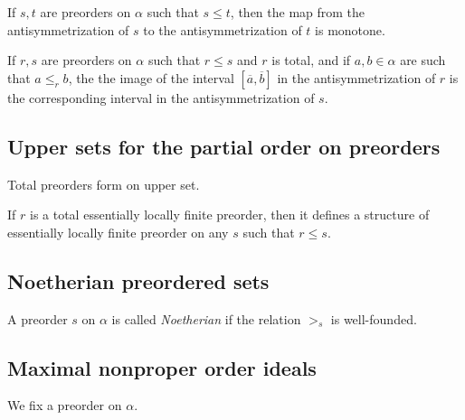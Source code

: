 \begin{sublemma}
If $s,t$ are preorders on $\alpha$ such that $s \le t$, then the map from the antisymmetrization of $s$ to the antisymmetrization
of $t$ is monotone.

\end{sublemma}

\begin{sublemma}
If $r,s$ are preorders on $\alpha$ such that $r\le s$ and $r$ is total, and if $a,b\in\alpha$ are such that $a\le_r b$, the the image
of the interval $[\overline{a},\overline{b}]$ in the antisymmetrization of $r$ is the corresponding interval in the
antisymmetrization of $s$.

\end{sublemma}


\subsection{Upper sets for the partial order on preorders}

\begin{sublemma}
Total preorders form on upper set.

\end{sublemma}

\begin{subdefi}
If $r$ is a total essentially locally finite preorder, then it defines a structure of essentially locally finite preorder on any $s$ such that
$r \le s$.

\end{subdefi}


\subsection{Noetherian preordered sets}

\begin{subdefi}[IsNoetherianPoset]
A preorder $s$ on $\alpha$ is called \emph{Noetherian} if the relation $>_s$ is well-founded.

\end{subdefi}

\subsection{Maximal nonproper order ideals}

We fix a preorder on $\alpha$.

